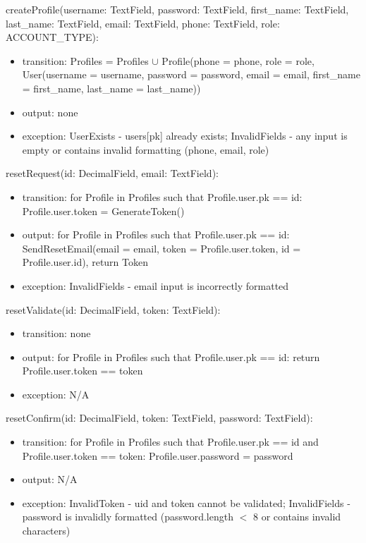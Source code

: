 \documentclass[12pt, titlepage]{article}
\begin{document}
\noindent createProfile(username: TextField, password: TextField, first\_name: TextField, last\_name: TextField, email: TextField, phone: TextField, role: ACCOUNT\_TYPE):
\begin{itemize}
    \item transition: Profiles = Profiles $\cup$ Profile(phone = phone, role = role, User(username = username, password = password, email = email, first\_name = first\_name, last\_name = last\_name))
    \item output: none
    \item exception: UserExists - users[pk] already exists; InvalidFields - any input is empty or contains invalid formatting (phone, email, role)
\end{itemize}

\noindent resetRequest(id: DecimalField, email: TextField):
\begin{itemize}
    \item transition: for Profile in Profiles such that Profile.user.pk == id: Profile.user.token = GenerateToken()
    \item output: for Profile in Profiles such that Profile.user.pk == id: SendResetEmail(email = email, token = Profile.user.token, id = Profile.user.id), return Token
    \item exception: InvalidFields - email input is incorrectly formatted
\end{itemize}

\noindent resetValidate(id: DecimalField, token: TextField):
\begin{itemize}
    \item transition: none
    \item output: for Profile in Profiles such that Profile.user.pk == id: return Profile.user.token == token
    \item exception: N/A
\end{itemize}

\noindent resetConfirm(id: DecimalField, token: TextField, password: TextField):
\begin{itemize}
    \item transition: for Profile in Profiles such that Profile.user.pk == id and Profile.user.token == token: Profile.user.password = password
    \item output: N/A
    \item exception: InvalidToken - uid and token cannot be validated; InvalidFields - password is invalidly formatted (password.length $<$ 8 or contains invalid characters)
\end{itemize}
\end{document}

